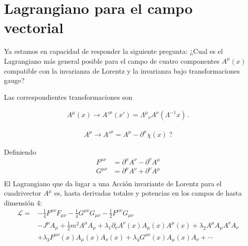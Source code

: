 \section{Lagrangiano para el campo vectorial}
\begin{frame}
Ya estamos en capacidad de responder la siguiente pregunta: ¿Cual es el Lagrangiano más general posible para el campo de cuatro componentes $A^{\mu}(x)$ compatible con la invarianza de Lorentz y la invarianza bajo transformaciones gauge?

Las correspondientes transformaciones son

\begin{align}
  A^\mu(x)\to {A'}^\mu(x')={\Lambda^\mu}_\nu A^\nu(\Lambda^{-1}x)\,.
\end{align}


\begin{align}
\label{eq:172qft}
  A^\mu\to{A'}^\mu=A^\mu-\partial^\mu\chi(x)\;?
\end{align}




Definiendo
\begin{align*}
  F^{\mu\nu}&=\partial^\mu A^\nu-\partial^\nu A^\mu\\
  G^{\mu\nu}&=\partial^\mu A^\nu+\partial^\nu A^\mu\\
\end{align*}
El Lagrangiano que da lugar a una Acción invariante de Lorentz para el cuadrivector $A^\mu$
es, hasta derivadas totales y potencias en los campos de hasta dimensión 4:
\begin{align}
  \mathcal{L}=&-\frac{1}{4}F^{\mu\nu}F_{\mu\nu}-\frac{1}{4}G^{\mu\nu}G_{\mu\nu}-\frac{1}{2}F^{\mu\nu}G_{\mu\nu}\nonumber\\
&-J^\mu A_\mu+
 \frac{1}{2}m^2A^\mu A_\mu +\lambda_1\partial_\nu A^\nu(x) A_\mu(x) A^\mu(x)+\lambda_2 A^\mu A_\mu A^\nu A_\nu\nonumber\\
&+\lambda_3 F^{\mu\nu}(x)A_\mu(x) A_\nu(x)+\lambda_4G^{\mu\nu}(x)A_\mu(x) A_\nu+\cdots
  \label{eq:lagAmu}
\end{align}
\end{frame}

